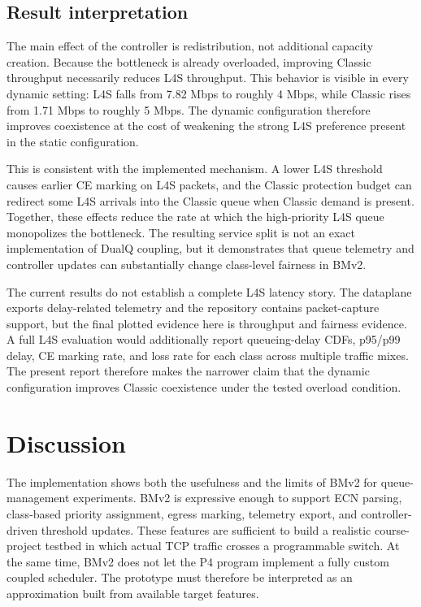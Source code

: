 \documentclass[10pt]{article}
\begin{document}
\subsection{Result interpretation}

The main effect of the controller is redistribution, not additional capacity creation. Because the bottleneck is already overloaded, improving Classic throughput necessarily reduces L4S throughput. This behavior is visible in every dynamic setting: L4S falls from 7.82 Mbps to roughly 4 Mbps, while Classic rises from 1.71 Mbps to roughly 5 Mbps. The dynamic configuration therefore improves coexistence at the cost of weakening the strong L4S preference present in the static configuration.

This is consistent with the implemented mechanism. A lower L4S threshold causes earlier CE marking on L4S packets, and the Classic protection budget can redirect some L4S arrivals into the Classic queue when Classic demand is present. Together, these effects reduce the rate at which the high-priority L4S queue monopolizes the bottleneck. The resulting service split is not an exact implementation of DualQ coupling, but it demonstrates that queue telemetry and controller updates can substantially change class-level fairness in BMv2.

The current results do not establish a complete L4S latency story. The dataplane exports delay-related telemetry and the repository contains packet-capture support, but the final plotted evidence here is throughput and fairness evidence. A full L4S evaluation would additionally report queueing-delay CDFs, p95/p99 delay, CE marking rate, and loss rate for each class across multiple traffic mixes. The present report therefore makes the narrower claim that the dynamic configuration improves Classic coexistence under the tested overload condition.

\section{Discussion}

The implementation shows both the usefulness and the limits of BMv2 for queue-management experiments. BMv2 is expressive enough to support ECN parsing, class-based priority assignment, egress marking, telemetry export, and controller-driven threshold updates. These features are sufficient to build a realistic course-project testbed in which actual TCP traffic crosses a programmable switch. At the same time, BMv2 does not let the P4 program implement a fully custom coupled scheduler. The prototype must therefore be interpreted as an approximation built from available target features.
\end{document}
